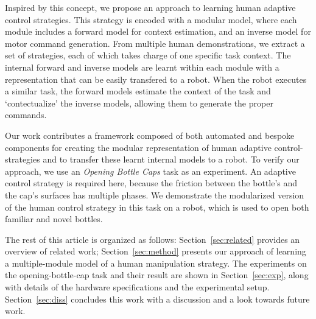 Inspired by this concept, we propose an approach to learning human
adaptive control strategies. This strategy is encoded with a modular
model, where each module includes a forward model for context
estimation, and an inverse model for motor command generation. From
multiple human demonstrations, we extract a set of strategies, each of
which takes charge of one specific task context. %
The internal forward and inverse models are learnt within each
module with a representation that can be easily transfered to a
robot. When the robot executes a similar task, the forward models
estimate the context of the task and 
`contectualize' the inverse models, allowing them to generate the proper commands.


Our work contributes a framework composed of both automated and
bespoke components for creating the modular representation of 
human adaptive control-strategies %
and to transfer these learnt internal models to a robot. To verify our
approach, we use an \emph{Opening Bottle Caps} task as an
experiment. An adaptive control strategy is required here, because the
friction between the bottle's and the cap's surfaces has multiple
phases. We demonstrate the modularized version of the human control
strategy in this task on a robot, which is used to open both familiar
and novel bottles.

The rest of this article is organized as follows:
Section~\ref{sec:related} provides an overview of related work;
Section~\ref{sec:method} presents our approach of learning a
multiple-module model of a human manipulation strategy. The
experiments on the opening-bottle-cap task and their result are shown
in Section~\ref{sec:exp}, along with details of the hardware
specifications and the experimental setup.  Section~\ref{sec:diss}
concludes this work with a discussion and a look towards future work.
